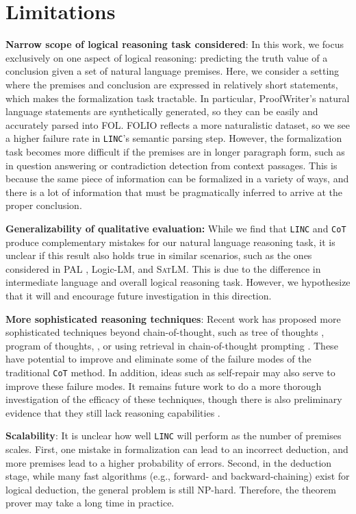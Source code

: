 \documentclass[11pt]{article}
\begin{document}
\section{Limitations}

\textbf{Narrow scope of logical reasoning task considered}:
In this work, we focus exclusively on one aspect of logical reasoning: predicting the truth value of a conclusion given a set of natural language premises. Here, we consider a setting where the premises and conclusion are expressed in relatively short statements, which makes the formalization task tractable. In particular, ProofWriter's natural language statements are synthetically generated, so they can be easily and accurately parsed into FOL. FOLIO reflects a more naturalistic dataset, so we see a higher failure rate in \texttt{LINC}'s semantic parsing step. However, the formalization task becomes more difficult if the premises are in longer paragraph form, such as in question answering or contradiction detection from context passages. This is because the same piece of information can be formalized in a variety of ways, and there is a lot of information that must be pragmatically inferred to arrive at the proper conclusion.


\textbf{Generalizability of qualitative evaluation:} While we find that \texttt{LINC} and \texttt{CoT} produce complementary mistakes for our natural language reasoning task, it is unclear if this result also holds true in similar scenarios, such as the ones considered in PAL \cite{gao2023pal}, Logic-LM, and \textsc{SatLM}. This is due to the difference in intermediate language and overall logical reasoning task. However, we hypothesize that it will and encourage future investigation in this direction.

\textbf{More sophisticated reasoning techniques}: Recent work has proposed more sophisticated techniques beyond chain-of-thought, such as tree of thoughts \cite{yao2023tree}, program of thoughts,  \cite{chen2022program}, or using retrieval in chain-of-thought prompting \cite{yasunaga2023large}. These have potential to improve and eliminate some of the failure modes of the traditional \texttt{CoT} method. In addition, ideas such as self-repair may also serve to improve these failure modes. It remains future work to do a more thorough investigation of the efficacy of these techniques, though there is also preliminary evidence that they still lack reasoning capabilities \cite{huang2023large}.

\textbf{Scalability}: It is unclear how well \texttt{LINC} will perform as the number of premises scales. First, one mistake in formalization can lead to an incorrect deduction, and more premises lead to a higher probability of errors. Second, in the deduction stage, while many fast algorithms (e.g., forward- and backward-chaining) exist for logical deduction, the general problem is still NP-hard. Therefore, the theorem prover may take a long time in practice.
\end{document}
